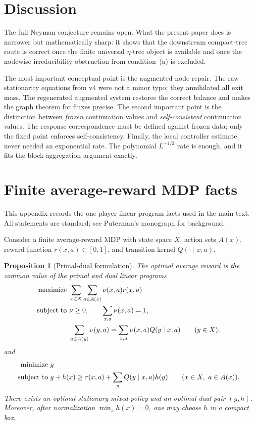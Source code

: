 \documentclass[12pt]{article}
\newtheorem{proposition}[theorem]{Proposition}
\theoremstyle{definition}
\newcommand{\1}{\mathbf{1}}
\begin{document}
\section{Discussion}

The full Neyman conjecture remains open.  What the present paper does is narrower
but mathematically sharp: it shows that the downstream compact-tree route is
correct once the finite universal $\eta$-tree object is available and once the
nodewise irreducibility obstruction from condition~\textnormal{(a)} is excluded.

The most important conceptual point is the augmented-node repair.  The raw
stationarity equations from v4 were not a minor typo; they annihilated all exit
mass.  The regenerated augmented system restores the correct balance and makes the
graph theorem for fluxes precise.  The second important point is the distinction
between \emph{frozen} continuation values and \emph{self-consistent} continuation
values.  The response correspondence must be defined against frozen data; only the
fixed point enforces self-consistency.  Finally, the local controller estimate
never needed an exponential rate.  The polynomial $L^{-1/2}$ rate is enough, and it
fits the block-aggregation argument exactly.

\appendix

\section{Finite average-reward MDP facts}
\label{app:mdp}

This appendix records the one-player linear-program facts used in the main text.
All statements are standard; see Puterman's monograph \cite{Puterman1994} for
background.

Consider a finite average-reward MDP with state space $X$, action sets $A(x)$,
reward function $r(x,a)\in[0,1]$, and transition kernel $Q(\cdot\mid x,a)$.

\begin{proposition}[Primal-dual formulation]
\label{prop:mdp-duality}
The optimal average reward is the common value of the primal and dual linear
programs
\begin{align*}
\textnormal{maximize }&\sum_{x\in X}\sum_{a\in A(x)}\nu(x,a)r(x,a)
\\
\textnormal{subject to }&\nu\ge 0,
\qquad \sum_{x,a}\nu(x,a)=1,
\\
&\sum_{a\in A(y)}\nu(y,a)=\sum_{x,a}\nu(x,a)Q(y\mid x,a)
\qquad (y\in X),
\end{align*}
and
\begin{align*}
\textnormal{minimize }&g
\\
\textnormal{subject to }&g+h(x)\ge r(x,a)+\sum_y Q(y\mid x,a)h(y)
\qquad (x\in X,\ a\in A(x)).
\end{align*}
There exists an optimal stationary mixed policy and an optimal dual pair $(g,h)$.
Moreover, after normalization $\min_x h(x)=0$, one may choose $h$ in a compact box.
\end{proposition}
\end{document}

